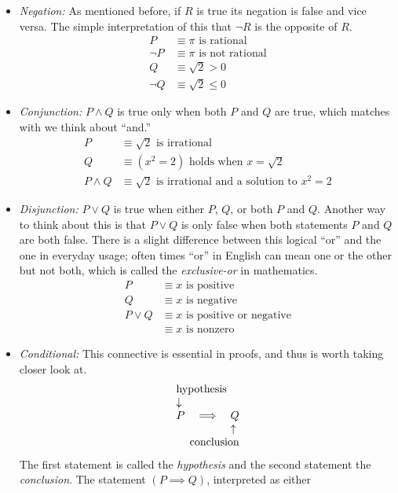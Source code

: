 \documentclass[twoside]{report}
\begin{document}
\begin{itemize}
	\item \emph{Negation:} As mentioned before, if $R$ is true its negation is false and vice versa. The simple interpretation of this that $\neg R$ is the opposite of $R$.
	\begin{align*}
		P &\equiv \text{$\pi$ is rational} \\
		\neg P &\equiv \text{$\pi$ is not rational} \\
		Q &\equiv \sqrt{2} > 0 \\
		\neg Q &\equiv \sqrt{2} \le 0
	\end{align*}
	
	\item \emph{Conjunction:} $P \wedge Q$ is true only when both $P$ and $Q$ are true, which matches with we think about ``and.''
	\begin{align*}
		P &\equiv \text{$\sqrt{2}$ is irrational} \\
		Q &\equiv \text{$(x^2 = 2)$ holds when $x = \sqrt{2}$} \\
		P \wedge Q &\equiv \text{$\sqrt{2}$ is irrational and a solution to $x^2 = 2$}
	\end{align*}

	\item \emph{Disjunction:} $P \lor Q$ is true when either $P$, $Q$, or both $P$ and $Q$. Another way to think about this is that  $P \lor Q$ is only false when both statements $P$ and $Q$ are both false. There is a slight difference between this logical ``or'' and the one in everyday usage; often times ``or'' in English can mean one or the other but not both, which is called the \emph{exclusive-or} in mathematics.
	\begin{align*}
		P &\equiv \text{$x$ is positive} \\
		Q &\equiv \text{$x$ is negative} \\
		P \lor Q &\equiv \text{$x$ is positive or negative} \\
		&\equiv \text{$x$ is nonzero}
	\end{align*}
	
	\item \emph{Conditional:} This connective is essential in proofs, and thus is worth taking closer look at.
	\begin{align*}
	\begin{array}{lll}
		\multicolumn{3}{l}{\text{hypothesis}} \\
		\downarrow && \\
		P & \implies & Q \\
		&& \uparrow \\
		\multicolumn{3}{r}{\text{conclusion}}
	\end{array}
	\end{align*}
	The first statement is called the \emph{hypothesis} and the second statement the \emph{conclusion}. The statement $(P \implies Q)$, interpreted as either
	

\end{itemize}
\end{document}
